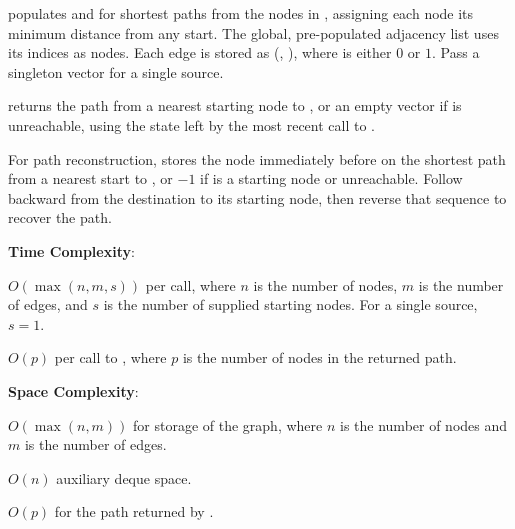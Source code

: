 \begin{compactitem}
  \item {} populates  and  for shortest paths from the nodes in , assigning each node its minimum distance from any start. The global, pre-populated adjacency list  uses its indices as nodes. Each edge is stored as (, ), where  is either $0$ or $1$. Pass a singleton vector for a single source.
  \item {} returns the path from a nearest starting node to , or an empty vector if  is unreachable, using the state left by the most recent call to .
\end{compactitem}

For path reconstruction,  stores the node immediately before  on the shortest path from a nearest start to , or $-1$ if  is a starting node or unreachable. Follow  backward from the destination to its starting node, then reverse that sequence to recover the path.

\textbf{Time Complexity}:
\begin{compactitem}
  \item $O(\max\left(n, m, s\right))$ per call, where $n$ is the number of nodes, $m$ is the number of edges, and $s$ is the number of supplied starting nodes. For a single source, $s = 1$.
  \item $O(p)$ per call to , where $p$ is the number of nodes in the returned path.
\end{compactitem}

\textbf{Space Complexity}:
\begin{compactitem}
  \item $O(\max\left(n, m\right))$ for storage of the graph, where $n$ is the number of nodes and $m$ is the number of edges.
  \item $O(n)$ auxiliary deque space.
  \item $O(p)$ for the path returned by .
\end{compactitem}

